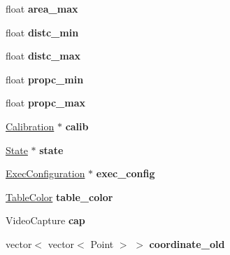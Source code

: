 \begin{DoxyCompactItemize}
\item 
float {\bfseries area\+\_\+max}\hypertarget{classvision_acd9de3a225e3a560cb0d25546a3dec80}{}\label{classvision_acd9de3a225e3a560cb0d25546a3dec80}

\item 
float {\bfseries distc\+\_\+min}\hypertarget{classvision_a55d7e213d59603d7ac47a52b84109809}{}\label{classvision_a55d7e213d59603d7ac47a52b84109809}

\item 
float {\bfseries distc\+\_\+max}\hypertarget{classvision_a20c85db3ec02873d653e5bb9b10c39ff}{}\label{classvision_a20c85db3ec02873d653e5bb9b10c39ff}

\item 
float {\bfseries propc\+\_\+min}\hypertarget{classvision_a91f86b737be2111668b21ee63797f401}{}\label{classvision_a91f86b737be2111668b21ee63797f401}

\item 
float {\bfseries propc\+\_\+max}\hypertarget{classvision_a6aeb3bfbd1eebe0a8e1d722eb8c21891}{}\label{classvision_a6aeb3bfbd1eebe0a8e1d722eb8c21891}

\item 
\hyperlink{structcommon_1_1Calibration}{Calibration} $\ast$ {\bfseries calib}\hypertarget{classvision_a7e5420798a60cb8b48e8a29b786f1683}{}\label{classvision_a7e5420798a60cb8b48e8a29b786f1683}

\item 
\hyperlink{structcommon_1_1State}{State} $\ast$ {\bfseries state}\hypertarget{classvision_a66846efba8a3de237d1a3c153ff1b812}{}\label{classvision_a66846efba8a3de237d1a3c153ff1b812}

\item 
\hyperlink{structcommon_1_1ExecConfiguration}{Exec\+Configuration} $\ast$ {\bfseries exec\+\_\+config}\hypertarget{classvision_a7929fc67b174048c25f34c064e6931ea}{}\label{classvision_a7929fc67b174048c25f34c064e6931ea}

\item 
\hyperlink{structcommon_1_1TableColor}{Table\+Color} {\bfseries table\+\_\+color}\hypertarget{classvision_a992a907eaa83feaa4fdec5eec0a3c978}{}\label{classvision_a992a907eaa83feaa4fdec5eec0a3c978}

\item 
Video\+Capture {\bfseries cap}\hypertarget{classvision_a6ce35c3216f36f741a0fab54e815d820}{}\label{classvision_a6ce35c3216f36f741a0fab54e815d820}

\item 
vector$<$ vector$<$ Point $>$ $>$ {\bfseries coordinate\+\_\+old}\hypertarget{classvision_a3d8aa1ce75f36f4bb0c2270100a1a0df}{}\label{classvision_a3d8aa1ce75f36f4bb0c2270100a1a0df}


\end{DoxyCompactItemize}
